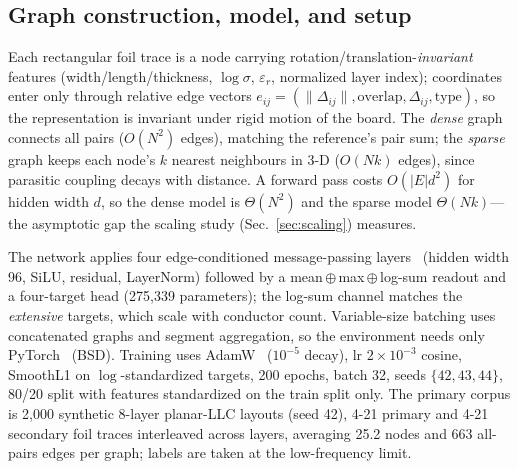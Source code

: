 \documentclass[letterpaper,twocolumn,9pt]{extarticle}
\begin{document}
\subsection{Graph construction, model, and setup}
Each rectangular foil trace is a node carrying rotation/translation-\emph{invariant}
features (width/length/thickness, $\log\sigma$, $\varepsilon_r$, normalized layer
index); coordinates enter only through relative edge vectors
$e_{ij}=(\lVert\Delta_{ij}\rVert,\mathrm{overlap},\Delta_{ij},\mathrm{type})$, so
the representation is invariant under rigid motion of the board. The \emph{dense}
graph connects all pairs ($O(N^2)$ edges), matching the reference's pair sum; the
\emph{sparse} graph keeps each node's $k$ nearest neighbours in 3-D ($O(Nk)$
edges), since parasitic coupling decays with distance. A forward pass costs
$O(|E|d^2)$ for hidden width $d$, so the dense model is $\Theta(N^2)$ and the
sparse model $\Theta(Nk)$---the asymptotic gap the scaling study
(Sec.~\ref{sec:scaling}) measures.

The network applies four edge-conditioned message-passing
layers~\cite{gilmer} (hidden width 96, SiLU, residual, LayerNorm) followed by a
mean\,$\oplus$\,max\,$\oplus$\,log-sum readout and a four-target head
(275{,}339 parameters); the log-sum channel matches the \emph{extensive} targets,
which scale with conductor count. Variable-size batching uses concatenated graphs
and segment aggregation, so the environment needs only PyTorch~\cite{pytorch}
(BSD). Training uses AdamW~\cite{adamw} ($10^{-5}$ decay), lr $2\times10^{-3}$
cosine, SmoothL1 on $\log$-standardized targets, 200 epochs, batch 32, seeds
$\{42,43,44\}$, 80/20 split with features standardized on the train split only.
The primary corpus is 2{,}000 synthetic 8-layer planar-LLC layouts (seed 42),
4-21 primary and 4-21 secondary foil traces interleaved across layers, averaging
25.2 nodes and 663 all-pairs edges per graph; labels are taken at the
low-frequency limit.
\end{document}

